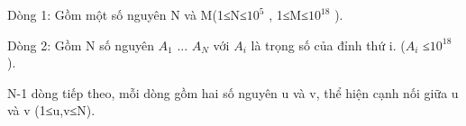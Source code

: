 Dòng 1: Gồm một số nguyên N và M(1≤N≤$10^{5}$   , 1≤M≤$10^{18}$   ).  

   Dòng 2: Gồm N số nguyên $A_{1}$   ... $A_{N}$   với $A_{i}$   là trọng số của đỉnh thứ i. ($A_{i}$   ≤$10^{18}$   ).  

   N-1 dòng tiếp theo, mỗi dòng gồm hai số nguyên u và v, thể hiện cạnh nối giữa u và v (1≤u,v≤N).